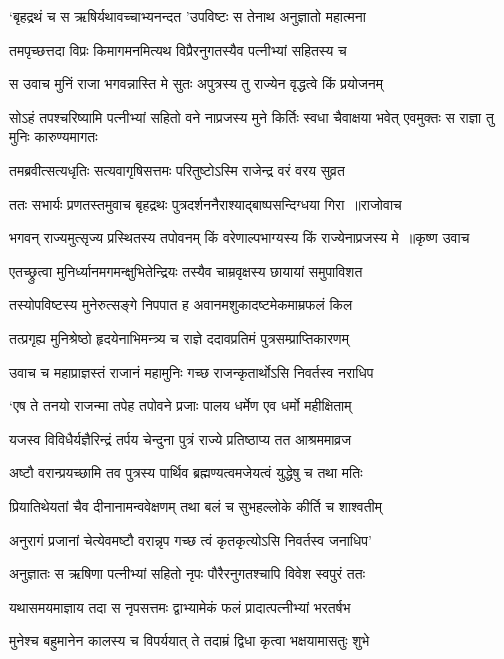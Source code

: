 \twolineshloka
{`बृहद्रथं च स ऋषिर्यथावच्चाभ्यनन्दत}
{'उपविष्टः स तेनाथ अनुज्ञातो महात्मना}


\twolineshloka
{तमपृच्छत्तदा विप्रः किमागमनमित्यथ}
{विप्रैरनुगतस्यैव पत्नीभ्यां सहितस्य च}


\twolineshloka
{स उवाच मुनिं राजा भगवन्नास्ति मे सुतः}
{अपुत्रस्य तु राज्येन वृद्धत्वे किं प्रयोजनम्}


\threelineshloka
{सोऽहं तपश्चरिष्यामि पत्नीभ्यां सहितो वने}
{नाप्रजस्य मुने किर्तिः स्वधा चैवाक्षया भवेत्}
{एवमुक्तः स राज्ञा तु मुनिः कारुण्यमागतः}


\twolineshloka
{तमब्रवीत्सत्यधृतिः सत्यवागृषिसत्तमः}
{परितुष्टोऽस्मि राजेन्द्र वरं वरय सुव्रत}


\twolineshloka
{ततः सभार्यः प्रणतस्तमुवाच बृहद्रथः}
{पुत्रदर्शननैराश्याद्बाष्पसन्दिग्धया गिरा ॥राजोवाच}


\threelineshloka
{भगवन् राज्यमुत्सृज्य प्रस्थितस्य तपोवनम्}
{किं वरेणाल्पभाग्यस्य किं राज्येनाप्रजस्य मे ॥कृष्ण उवाच}
{}


\twolineshloka
{एतच्छ्रुत्वा मुनिर्ध्यानमगमन्क्षुभितेन्द्रियः}
{तस्यैव चाम्रवृक्षस्य छायायां समुपाविशत}


\twolineshloka
{तस्योपविष्टस्य मुनेरुत्सङ्गे निपपात ह}
{अवानमशुकादष्टमेकमाम्रफलं किल}


\twolineshloka
{तत्प्रगृह्य मुनिश्रेष्ठो हृदयेनाभिमन्त्र्य च}
{राज्ञे ददावप्रतिमं पुत्रसम्प्राप्तिकारणम्}


\twolineshloka
{उवाच च महाप्राज्ञस्तं राजानं महामुनिः}
{गच्छ राजन्कृतार्थोऽसि निवर्तस्व नराधिप}


\twolineshloka
{`एष ते तनयो राजन्मा तपेह तपोवने}
{प्रजाः पालय धर्मेण एव धर्मो महीक्षिताम्}


\twolineshloka
{यजस्व विविधैर्यज्ञैरिन्द्रं तर्पय चेन्दुना}
{पुत्रं राज्ये प्रतिष्ठाप्य तत आश्रममाव्रज}


\twolineshloka
{अष्टौ वरान्प्रयच्छामि तव पुत्रस्य पार्थिव}
{ब्रह्मण्यत्वमजेयत्वं युद्धेषु च तथा मतिः}


\twolineshloka
{प्रियातिथेयतां चैव दीनानामन्ववेक्षणम्}
{तथा बलं च सुभहल्लोके कीर्ति च शाश्वतीम्}


\twolineshloka
{अनुरागं प्रजानां चेत्येवमष्टौ वरान्नृप}
{गच्छ त्वं कृतकृत्योऽसि निवर्तस्व जनाधिप'}


\twolineshloka
{अनुज्ञातः स ऋषिणा पत्नीभ्यां सहितो नृपः}
{पौरैरनुगतश्चापि विवेश स्वपुरं ततः}


\twolineshloka
{यथासमयमाज्ञाय तदा स नृपसत्तमः}
{द्वाभ्यामेकं फलं प्रादात्पत्नीभ्यां भरतर्षभ}


\threelineshloka
{मुनेश्च बहुमानेन कालस्य च विपर्ययात्}
{ते तदाम्रं द्विधा कृत्वा भक्षयामासतुः शुभे}
{}


